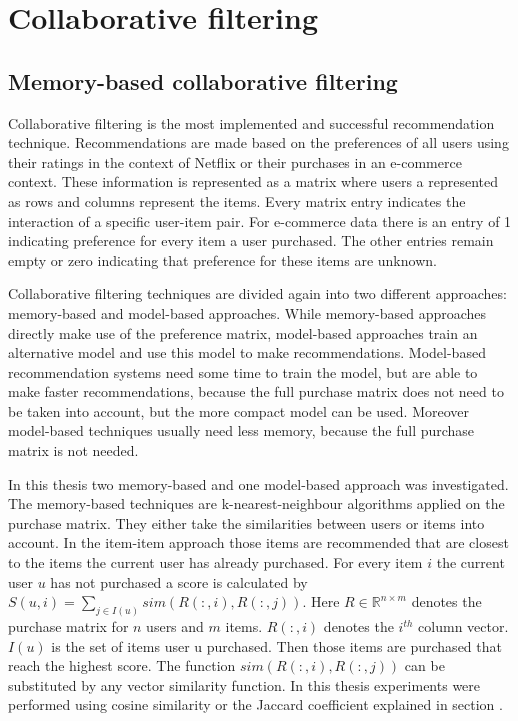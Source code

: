 \documentclass[10pt]{reportMaster}
\begin{document}
\section{Collaborative filtering}
\label{rs_cf}
\subsection{Memory-based collaborative filtering}
Collaborative filtering is the most implemented and successful recommendation technique. %
Recommendations are made based on the preferences of all users using their ratings in the context of Netflix or their purchases in an e-commerce context.
These information is represented as a matrix where users a represented as rows and columns represent the items.
Every matrix entry indicates the interaction of a specific user-item pair.
For e-commerce data there is an entry of 1 indicating preference for every item a user purchased.
The other entries remain empty or zero indicating that preference for these items are unknown. %

Collaborative filtering techniques are divided again into two different approaches: memory-based and model-based approaches.
While memory-based approaches directly make use of the preference matrix, model-based approaches train an alternative model and use this model to make recommendations.
Model-based recommendation systems need some time to train the model, but are able to make faster recommendations, because the full purchase matrix does not need to be taken into account, but the more compact model can be used.
Moreover model-based techniques usually need less memory, because the full purchase matrix is not needed.

In this thesis two memory-based and one model-based approach was investigated.
The memory-based techniques are k-nearest-neighbour algorithms applied on the purchase matrix.
They either take the similarities between users or items into account. %
In the item-item approach those items are recommended that are closest to the items the current user has already purchased.
For every item $i$ the current user $u$ has not purchased a score is calculated by $S(u,i) = \sum_{j \in I(u)}{sim(R(:,i), R(:,j))}$. Here $R \in \mathds{R}^{n \times m}$ denotes the purchase matrix for $n$ users and $m$ items. $R(:,i)$ denotes the $i^{th}$ column vector. $I(u)$ is the set of items user u purchased.
Then those items are purchased that reach the highest score. %
The function $sim(R(:,i), R(:,j))$ can be substituted by any vector similarity function.
In this thesis experiments were performed using cosine similarity or the Jaccard coefficient explained in section . %
\end{document}
